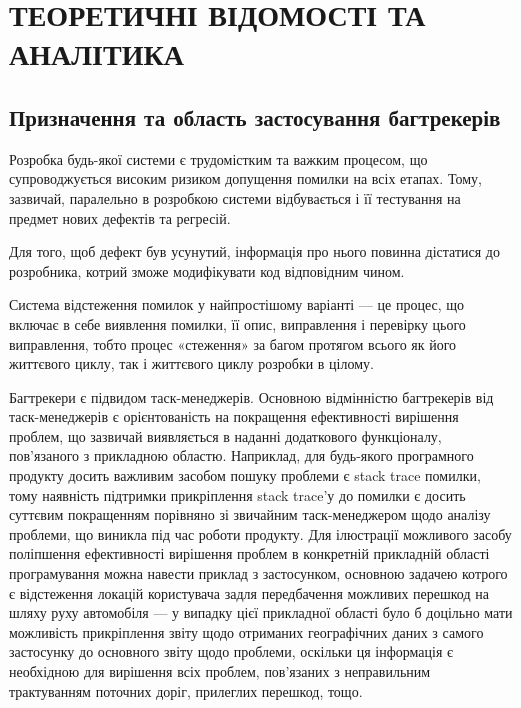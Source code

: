 \documentclass[../main.tex]{subfiles}
\begin{document}
\chapter{ТЕОРЕТИЧНІ ВІДОМОСТІ ТА АНАЛІТИКА}

\section{Призначення та область застосування багтрекерів}

Розробка будь-якої системи є трудомістким та важким процесом, що супроводжується високим ризиком допущення помилки на всіх етапах. Тому, зазвичай, паралельно в розробкою системи відбувається і її тестування на предмет нових дефектів та регресій.

Для того, щоб дефект був усунутий, інформація про нього повинна дістатися до розробника, котрий зможе модифікувати код відповідним чином.

Система відстеження помилок у найпростішому варіанті — це процес, що включає в себе виявлення помилки, її опис, виправлення і перевірку цього виправлення, тобто процес «стеження» за багом протягом всього як його життєвого циклу, так і життєвого циклу розробки в цілому.\cite{bugtracking_systems}

Багтрекери є підвидом таск-менеджерів. Основною відмінністю багтрекерів від таск-менеджерів є  орієнтованість на покращення ефективності вирішення проблем, що зазвичай виявляється в наданні додаткового функціоналу, пов'язаного з прикладною областю. Наприклад, для будь-якого програмного продукту досить важливим засобом пошуку проблеми є stack trace помилки, тому наявність підтримки прикріплення stack trace'у до помилки є досить суттєвим покращенням порівняно зі звичайним таск-менеджером щодо аналізу проблеми, що виникла під час роботи продукту. Для ілюстрації можливого засобу поліпшення ефективності вирішення проблем в конкретній прикладній області програмування можна навести приклад з застосунком, основною задачею котрого є відстеження локацій користувача задля передбачення можливих перешкод на шляху руху автомобіля — у випадку цієї прикладної області було б доцільно мати можливість прикріплення звіту щодо отриманих географічних даних з самого застосунку до основного звіту щодо проблеми, оскільки ця інформація є необхідною для вирішення всіх проблем, пов'язаних з неправильним трактуванням поточних доріг, прилеглих перешкод, тощо.
\end{document}
